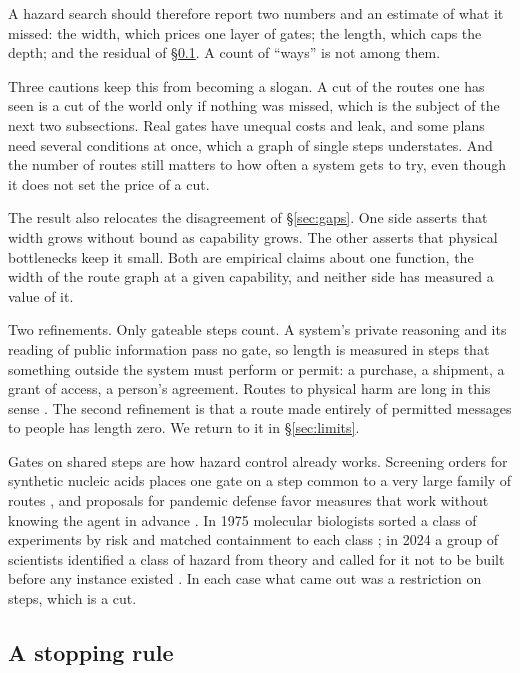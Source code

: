\documentclass[10pt,twocolumn]{article}
\theoremstyle{plain}
\theoremstyle{definition}
\begin{document}
A hazard search should therefore report two numbers and an estimate of what it missed: the
width, which prices one layer of gates; the length, which caps the depth; and the residual of
\S\ref{sec:stop}. A count of ``ways'' is not among them.

Three cautions keep this from becoming a slogan. A cut of the routes one has seen is a cut of
the world only if nothing was missed, which is the subject of the next two subsections. Real
gates have unequal costs and leak, and some plans need several conditions at once, which a
graph of single steps understates. And the number of routes still matters to how often a
system gets to try, even though it does not set the price of a cut.

The result also relocates the disagreement of \S\ref{sec:gaps}. One side asserts that width
grows without bound as capability grows. The other asserts that physical bottlenecks keep it
small. Both are empirical claims about one function, the width of the route graph at a given
capability, and neither side has measured a value of it.

Two refinements. Only gateable steps count. A system's private reasoning and its reading of
public information pass no gate, so length is measured in steps that something outside the
system must perform or permit: a purchase, a shipment, a grant of access, a person's
agreement. Routes to physical harm are long in this sense
\cite{vermeer2025,hong2026}. The second refinement is that a route made entirely of permitted
messages to people has length zero. We return to it in \S\ref{sec:limits}.

Gates on shared steps are how hazard control already works. Screening orders for synthetic
nucleic acids places one gate on a step common to a very large family of routes
\cite{hhs2023}, and proposals for pandemic defense favor measures that work without knowing
the agent in advance \cite{esvelt2022}. In 1975 molecular biologists sorted a class of
experiments by risk and matched containment to each class \cite{berg1975}; in 2024 a group of
scientists identified a class of hazard from theory and called for it not to be built before
any instance existed \cite{adamala2024}. In each case what came out was a restriction on
steps, which is a cut.

\subsection{A stopping rule}\label{sec:stop}
\end{document}
